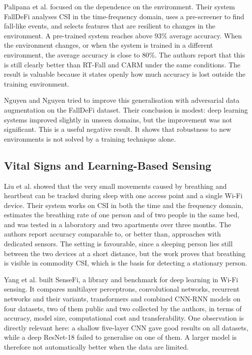 Palipana et al. \cite{falldefi} focused on the dependence on the environment. Their system FallDeFi analyses CSI in the time-frequency domain, uses a pre-screener to find fall-like events, and selects features that are resilient to changes in the environment. A pre-trained system reaches above 93\% average accuracy. When the environment changes, or when the system is trained in a different environment, the average accuracy is close to 80\%. The authors report that this is still clearly better than RT-Fall and CARM under the same conditions. The result is valuable because it states openly how much accuracy is lost outside the training environment.

Nguyen and Nguyen \cite{adafall} tried to improve this generalisation with adversarial data augmentation on the FallDeFi dataset. Their conclusion is modest: deep learning systems improved slightly in unseen domains, but the improvement was not significant. This is a useful negative result. It shows that robustness to new environments is not solved by a training technique alone.

\subsection{Vital Signs and Learning-Based Sensing}
Liu et al. \cite{vitalsigns} showed that the very small movements caused by breathing and heartbeat can be tracked during sleep with one access point and a single Wi-Fi device. Their system works on CSI in both the time and the frequency domain, estimates the breathing rate of one person and of two people in the same bed, and was tested in a laboratory and two apartments over three months. The authors report accuracy comparable to, or better than, approaches with dedicated sensors. The setting is favourable, since a sleeping person lies still between the two devices at a short distance, but the work proves that breathing is visible in commodity CSI, which is the basis for detecting a stationary person.

Yang et al. \cite{sensefi} built SenseFi, a library and benchmark for deep learning in Wi-Fi sensing. It compares multilayer perceptrons, convolutional networks, recurrent networks and their variants, transformers and combined CNN-RNN models on four datasets, two of them public and two collected by the authors, in terms of accuracy, model size, computational cost and transferability. One observation is directly relevant here: a shallow five-layer CNN gave good results on all datasets, while a deep ResNet-18 failed to generalise on one of them. A larger model is therefore not automatically better when the data are limited.

